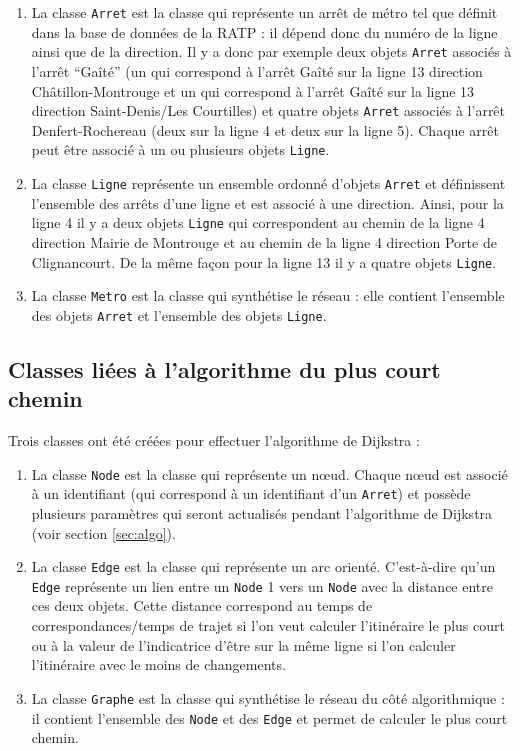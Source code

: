 \documentclass[,french]{article}
\begin{document}
\begin{enumerate}
\def\labelenumi{\arabic{enumi}.}
\item
  La classe \texttt{Arret} est la classe qui représente un arrêt de
  métro tel que définit dans la base de données de la RATP : il dépend
  donc du numéro de la ligne ainsi que de la direction. Il y a donc par
  exemple deux objets \texttt{Arret} associés à l'arrêt ``Gaîté'' (un
  qui correspond à l'arrêt Gaîté sur la ligne 13 direction
  Châtillon-Montrouge et un qui correspond à l'arrêt Gaîté sur la ligne
  13 direction Saint-Denis/Les Courtilles) et quatre objets
  \texttt{Arret} associés à l'arrêt Denfert-Rochereau (deux sur la ligne
  4 et deux sur la ligne 5). Chaque arrêt peut être associé à un ou
  plusieurs objets \texttt{Ligne}.
\item
  La classe \texttt{Ligne} représente un ensemble ordonné d'objets
  \texttt{Arret} et définissent l'ensemble des arrêts d'une ligne et est
  associé à une direction. Ainsi, pour la ligne 4 il y a deux objets
  \texttt{Ligne} qui correspondent au chemin de la ligne 4 direction
  Mairie de Montrouge et au chemin de la ligne 4 direction Porte de
  Clignancourt. De la même façon pour la ligne 13 il y a quatre objets
  \texttt{Ligne}.
\item
  La classe \texttt{Metro} est la classe qui synthétise le réseau : elle
  contient l'ensemble des objets \texttt{Arret} et l'ensemble des objets
  \texttt{Ligne}.
\end{enumerate}

\hypertarget{classes-liuxe9es-uxe0-lalgorithme-du-plus-court-chemin}{%
\subsection{Classes liées à l'algorithme du plus court
chemin}\label{classes-liuxe9es-uxe0-lalgorithme-du-plus-court-chemin}}

Trois classes ont été créées pour effectuer l'algorithme de Dijkstra :

\begin{enumerate}
\def\labelenumi{\arabic{enumi}.}
\item
  La classe \texttt{Node} est la classe qui représente un nœud. Chaque
  nœud est associé à un identifiant (qui correspond à un identifiant
  d'un \texttt{Arret}) et possède plusieurs paramètres qui seront
  actualisés pendant l'algorithme de Dijkstra (voir section
  \ref{sec:algo}).
\item
  La classe \texttt{Edge} est la classe qui représente un arc orienté.
  C'est-à-dire qu'un \texttt{Edge} représente un lien entre un
  \texttt{Node} 1 vers un \texttt{Node} avec la distance entre ces deux
  objets. Cette distance correspond au temps de correspondances/temps de
  trajet si l'on veut calculer l'itinéraire le plus court ou à la valeur
  de l'indicatrice d'être sur la même ligne si l'on calculer
  l'itinéraire avec le moins de changements.
\item
  La classe \texttt{Graphe} est la classe qui synthétise le réseau du
  côté algorithmique : il contient l'ensemble des \texttt{Node} et des
  \texttt{Edge} et permet de calculer le plus court chemin.
\end{enumerate}
\end{document}
